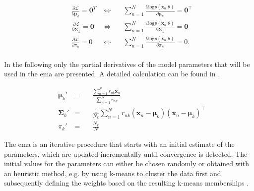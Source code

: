 \documentclass[../../../main.tex]{subfiles}
\begin{document}
\begin{equation*}
    \begin{aligned}
    &\frac{\partial{\mathcal{L}}}{\partial{\bm{\mu}_k}} = \bm{0}^T \; &\Longleftrightarrow \quad &\sum\limits_{n=1}^N\frac{\partial{\mathrm{log}p(\bm{x}_n| \theta)}}{\partial{\bm{\mu}_k}} = \bm{0}^\top\\[5pt]
    &\frac{\partial{\mathcal{L}}}{\partial{\bm{\Sigma}_k}} = \bm{0} \; &\Longleftrightarrow \quad &\sum\limits_{n=1}^N\frac{\partial{\mathrm{log}p(\bm{x}_n| \theta)}}{\partial{\bm{\Sigma}_k}} = \bm{0}\\[5pt]
    &\frac{\partial{\mathcal{L}}}{\partial{\pi_k}} = 0 \; &\Longleftrightarrow \quad &\sum\limits_{n=1}^N\frac{\partial{\mathrm{log}p(\bm{x}_n| \theta)}}{\partial{\pi_k}} = 0.\\
    \end{aligned}
\end{equation*}

In the following only the partial derivatives of the model parameters that will be used in the \acrshort{ema} are presented. A detailed calculation can be found in \cite[pp.319]{dei_2020}.

\begin{equation}\label{eq:ml_estimator}
    \begin{aligned}
    &\bm{\mu}_k' &= \quad &\frac{\sum_{n=1}^N r_{nk}\bm{x}_n}{\sum_{n=1}^N r_{nk}} \\
    &\bm{\Sigma}_k' &= \quad &\frac{1}{N_k}\sum_{n=1}^N r_{nk}(\bm{x}_n-\bm{\mu}_k)(\bm{x}_n-\bm{\mu}_k)^\top\\
    &\pi_k' &= \quad &\frac{N_k}{N}
    \end{aligned}
\end{equation}


The \acrshort{ema} is an iterative procedure that starts with an initial estimate of the parameters, which are updated incrementally until convergence is detected. The initial values for the parameters can either be chosen randomly or obtained with an heuristic method, e.g. by using k-means to cluster the data first and subsequently defining the weights based on the resulting k-means memberships \cite[pp. 325]{dei_2020}. 
\end{document}
